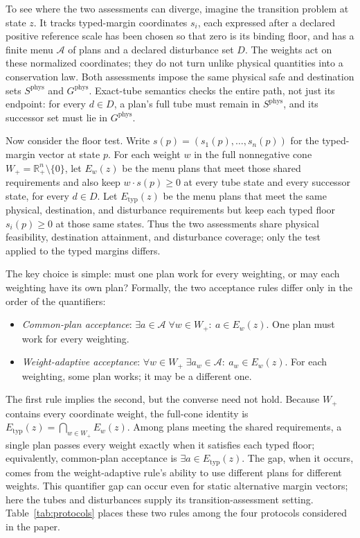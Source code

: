 \documentclass[preprint,11pt,authoryear]{elsarticle}
\theoremstyle{definition}
\theoremstyle{remark}
\newcommand{\Etyp}{E_{\mathrm{typ}}}
\newcommand{\Wp}{W_+}
\newcommand{\Rp}{\mathbb{R}^n_+}
\begin{document}
To see where the two assessments can diverge, imagine the transition problem at state $z$. It tracks typed-margin coordinates $s_i$, each expressed after a declared positive reference scale has been chosen so that zero is its binding floor, and has a finite menu $\mathcal A$ of plans and a declared disturbance set $D$. The weights act on these normalized coordinates; they do not turn unlike physical quantities into a conservation law. Both assessments impose the same physical safe and destination sets $S^{\mathrm{phys}}$ and $G^{\mathrm{phys}}$. Exact-tube semantics checks the entire path, not just its endpoint: for every $d\in D$, a plan's full tube must remain in $S^{\mathrm{phys}}$, and its successor set must lie in $G^{\mathrm{phys}}$.

\begin{samepage}
Now consider the floor test. Write $s(p)=(s_1(p),\dots,s_n(p))$ for the typed-margin vector at state $p$. For each weight $w$ in the full nonnegative cone $\Wp=\Rp\setminus\{0\}$, let $E_w(z)$ be the menu plans that meet those shared requirements and also keep $w\cdot s(p)\ge0$ at every tube state and every successor state, for every $d\in D$. Let $\Etyp(z)$ be the menu plans that meet the same physical, destination, and disturbance requirements but keep each typed floor $s_i(p)\ge0$ at those same states. Thus the two assessments share physical feasibility, destination attainment, and disturbance coverage; only the test applied to the typed margins differs.
\end{samepage}

The key choice is simple: must one plan work for every weighting, or may each weighting have its own plan? Formally, the two acceptance rules differ only in the order of the quantifiers:
\begin{itemize}[leftmargin=2em]
\item \emph{Common-plan acceptance}: $\exists a\in\mathcal A\;\forall w\in\Wp:\ a\in E_w(z)$. One plan must work for every weighting.
\item \emph{Weight-adaptive acceptance}: $\forall w\in\Wp\;\exists a_w\in\mathcal A:\ a_w\in E_w(z)$. For each weighting, some plan works; it may be a different one.
\end{itemize}
The first rule implies the second, but the converse need not hold. Because $\Wp$ contains every coordinate weight, the full-cone identity is $\Etyp(z)=\bigcap_{w\in\Wp}E_w(z)$. Among plans meeting the shared requirements, a single plan passes every weight exactly when it satisfies each typed floor; equivalently, common-plan acceptance is $\exists a\in\Etyp(z)$. The gap, when it occurs, comes from the weight-adaptive rule's ability to use different plans for different weights. This quantifier gap can occur even for static alternative margin vectors; here the tubes and disturbances supply its transition-assessment setting. Table~\ref{tab:protocols} places these two rules among the four protocols considered in the paper.
\end{document}
